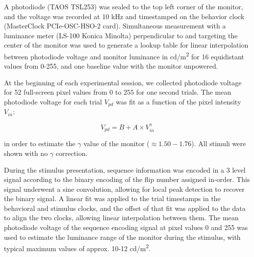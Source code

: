 \documentclass{article} %
\begin{document}
A photodiode (TAOS TSL253) was sealed to the top left corner of the monitor, and the voltage was recorded at 10 kHz and timestamped on the behavior clock (MasterClock PCIe-OSC-HSO-2 card).  
Simultaneous measurement with a luminance meter (LS-100 Konica Minolta) perpendicular to and targeting the center of the monitor was used to generate a lookup table for linear interpolation between photodiode voltage and monitor luminance in cd/m\textsuperscript{2} for 16 equidistant values from 0-255, and one baseline value with the monitor unpowered.

At the beginning of each experimental session, we collected photodiode voltage for 52 full-screen pixel values from 0 to 255 for one second trials.  
The mean photodiode voltage for each trial $V_{pd}$ was fit as a function of the pixel intensity $V_{in}$:

\begin{equation}
     V_{pd} = B + A \times V_{in}^{\gamma}
 \end{equation}

in order to estimate the $\gamma$ value of the monitor ($ \approx 1.50-1.76$).  All stimuli were shown with no $\gamma$ correction.  

During the stimulus presentation, sequence information was encoded in a 3 level signal according to the binary encoding of the flip number assigned in-order.  
This signal underwent a sine convolution, allowing for local peak detection to recover the binary signal.  
A linear fit was applied to the trial timestamps in the behavioral and stimulus clocks, and the offset of that fit was applied to the data to align the two clocks, allowing linear interpolation between them. 
The mean photodiode voltage of the sequence encoding signal at pixel values 0 and 255 was used to estimate the luminance range of the monitor during the stimulus, with typical maximum values of approx. 10-12 cd/m\textsuperscript{2}.

\newcommand{\source}[2]{#1\\{\small\itshape #2}}
\end{document}

